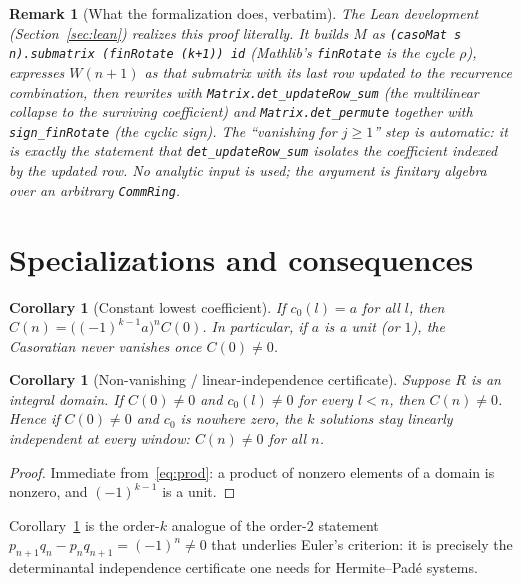 \documentclass[11pt]{article}
\newtheorem{corollary}[theorem]{Corollary}
\newtheorem{remark}[theorem]{Remark}
\newcommand{\Caso}{C}
\newcommand{\CasoM}{W}
\begin{document}
\begin{remark}[What the formalization does, verbatim]\label{rem:lean-proof}
The Lean development (Section~\ref{sec:lean}) realizes this proof literally. It builds
$M$ as \texttt{(casoMat\,s\,n).submatrix (finRotate (k+1)) id} (Mathlib's
\texttt{finRotate} is the cycle $\rho$), expresses $\CasoM(n+1)$ as that submatrix with
its last row updated to the recurrence combination, then rewrites with
\texttt{Matrix.det\_updateRow\_sum} (the multilinear collapse to the surviving
coefficient) and \texttt{Matrix.det\_permute} together with \texttt{sign\_finRotate}
(the cyclic sign). The ``vanishing for $j\ge1$'' step is automatic: it is exactly the
statement that \texttt{det\_updateRow\_sum} isolates the coefficient indexed by the
updated row. No analytic input is used; the argument is finitary algebra over an
arbitrary \texttt{CommRing}.
\end{remark}

\section{Specializations and consequences}\label{sec:cons}

\begin{corollary}[Constant lowest coefficient]\label{cor:const}
If $c_0(l)=a$ for all $l$, then $\Caso(n)=\big((-1)^{k-1}a\big)^n\Caso(0)$. In
particular, if $a$ is a unit (or $1$), the Casoratian never vanishes once
$\Caso(0)\ne0$.
\end{corollary}

\begin{corollary}[Non-vanishing / linear-independence certificate]\label{cor:indep}
Suppose $R$ is an integral domain. If $\Caso(0)\ne0$ and $c_0(l)\ne0$ for every
$l<n$, then $\Caso(n)\ne0$. Hence if $\Caso(0)\ne0$ and $c_0$ is nowhere zero, the
$k$ solutions stay linearly independent at every window: $\Caso(n)\ne0$ for all $n$.
\end{corollary}

\begin{proof}
Immediate from~\eqref{eq:prod}: a product of nonzero elements of a domain is nonzero,
and $(-1)^{k-1}$ is a unit.
\end{proof}

Corollary~\ref{cor:indep} is the order-$k$ analogue of the order-$2$ statement
$p_{n+1}q_n-p_nq_{n+1}=(-1)^n\ne0$ that underlies Euler's criterion: it is precisely
the determinantal independence certificate one needs for Hermite--Pad\'e systems.
\end{document}
